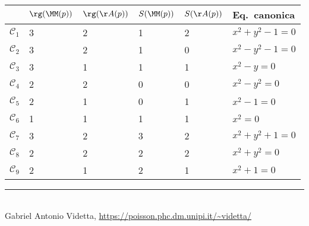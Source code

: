 \documentclass[10pt,landscape]{article}
\begin{document}
\begin{multicols}{3}
		\begin{center}
			\tiny
			\begin{tabular}{|l|l|l|l|l|l|}
				\hline
				& $\rg(\MM(p))$ & $\rg(\AA(p))$ & $S(\MM(p))$ & $S(\AA(p))$ & Eq.~canonica \\ \hline
				$\mathcal{C}_1$ & 3 & 2 & 1 & 2 & $x^2+y^2-1=0$ \\ \hline
				$\mathcal{C}_2$ & 3 & 2 & 1 & 0 & $x^2-y^2-1=0$ \\ \hline
				$\mathcal{C}_3$ & 3 & 1 & 1 & 1 & $x^2-y=0$ \\ \hline
				$\mathcal{C}_4$ & 2 & 2 & 0 & 0 & $x^2-y^2=0$ \\ \hline
				$\mathcal{C}_5$ & 2 & 1 & 0 & 1 & $x^2-1=0$ \\ \hline
				$\mathcal{C}_6$ & 1 & 1 & 1 & 1 & $x^2=0$ \\ \hline
				$\mathcal{C}_7$ & 3 & 2 & 3 & 2 & $x^2+y^2+1=0$ \\ \hline
				$\mathcal{C}_8$ & 2 & 2 & 2 & 2 & $x^2+y^2=0$ \\ \hline
				$\mathcal{C}_9$ & 2 & 1 & 2 & 1 & $x^2+1=0$ \\ \hline
			\end{tabular}
		\end{center}
		
		\vfill
		\hrule
		~\\
		Gabriel Antonio Videtta, \url{https://poisson.phc.dm.unipi.it/~videtta/}
	\end{multicols}
	
\end{document}
